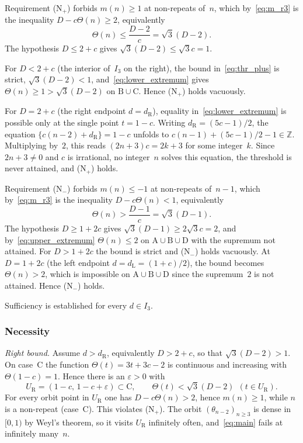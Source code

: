 \documentclass{birkjour}
\theoremstyle{definition}
\theoremstyle{remark}
\begin{document}
Requirement (N$_{+}$) forbids $m(n)\ge 1$ at
non-repeats of~$n$, which by~\eqref{eq:m_r3} is the
inequality $D-c\Theta(n)\ge 2$, equivalently
\begin{equation}\label{eq:thr_plus}
  \Theta(n)\le \frac{D-2}{c}=\sqrt{3}(D-2).
\end{equation}
The hypothesis $D\le 2+c$ gives
$\sqrt{3}(D-2)\le \sqrt{3}c=1$.

For $D<2+c$ (the interior of~$I_{3}$ on the right),
the bound in~\eqref{eq:thr_plus} is strict,
$\sqrt{3}(D-2)<1$, and~\eqref{eq:lower_extremum} gives
$\Theta(n)\ge 1>\sqrt{3}(D-2)$ on
$\mathrm{B}\cup\mathrm{C}$. Hence (N$_{+}$) holds
vacuously.

For $D=2+c$ (the right endpoint $d=d_{\mathrm{R}}$),
equality in~\eqref{eq:lower_extremum} is possible only at the single
point $t=1-c$. Writing $d_{\mathrm{R}}=(5c-1)/2$, the
equation $\{c(n-2)+d_{\mathrm{R}}\}=1-c$ unfolds to
$c(n-1)+(5c-1)/2-1\in\mathbb{Z}$. Multiplying by~$2$,
this reads $(2n+3)c=2k+3$ for some integer~$k$.
Since $2n+3\ne 0$ and $c$ is irrational, no
integer~$n$ solves this equation, the threshold is
never attained, and (N$_{+}$) holds.

Requirement (N$_{-}$) forbids $m(n)\le -1$ at
non-repeats of~$n-1$, which by~\eqref{eq:m_r3} is
the inequality $D-c\Theta(n)<1$, equivalently
\begin{equation*}  \Theta(n)>\frac{D-1}{c}=\sqrt{3}(D-1).
\end{equation*}
The hypothesis $D\ge 1+2c$ gives
$\sqrt{3}(D-1)\ge 2\sqrt{3}c=2$, and by~\eqref{eq:upper_extremum}
$\Theta(n)\le 2$ on
$\mathrm{A}\cup\mathrm{B}\cup\mathrm{D}$ with
the supremum not attained. For $D>1+2c$ the bound
is strict and (N$_{-}$) holds vacuously. At
$D=1+2c$ (the left endpoint $d=d_{\mathrm{L}}=(1+c)/2$),
the bound becomes $\Theta(n)>2$, which is impossible
on $\mathrm{A}\cup\mathrm{B}\cup\mathrm{D}$ since
the supremum~$2$ is not attained. Hence (N$_{-}$)
holds.

Sufficiency is established for every $d\in I_{3}$.

\subsubsection*{Necessity}

\emph{Right bound.} Assume $d>d_{\mathrm{R}}$, equivalently
$D>2+c$, so that $\sqrt{3}(D-2)>1$. On case~C the function
$\Theta(t)=3t+3c-2$ is continuous and increasing with
$\Theta(1-c)=1$. Hence there is an $\varepsilon>0$ with
\[
  U_{\mathrm{R}}=(1-c,\,1-c+\varepsilon)\subset\mathrm{C},
  \qquad
  \Theta(t)<\sqrt{3}(D-2)\ \ (t\in U_{\mathrm{R}}).
\]
For every orbit point in $U_{\mathrm{R}}$ one has $D-c\Theta(n)>2$,
hence $m(n)\ge 1$, while $n$ is a non-repeat (case~C). This
violates (N$_{+}$). The orbit $(\theta_{n-2})_{n\ge 3}$ is
dense in $[0,1)$ by Weyl's theorem, so it visits $U_{\mathrm{R}}$
infinitely often, and~\eqref{eq:main} fails at infinitely
many~$n$.
\end{document}
